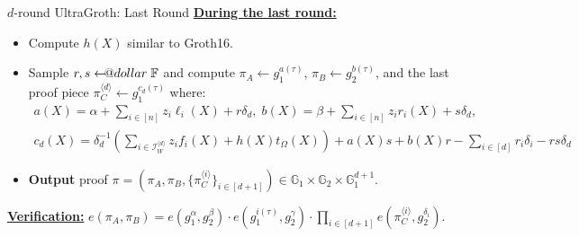 \documentclass{zkdl-presentation-template}
\makeatletter
\newcommand\leftarrowS{\leftarrow\joinrel\smalldollar}
\newcommand{\smalldollar}{\mathrel{\mathpalette\small@dollar\relax}}
\newcommand{\small@dollar}[2]{%
  \vcenter{\hbox{%
    $#1\textnormal{\fontsize{0.7\dimexpr\f@size pt}{0}\selectfont\$}$%
  }}%
}
\makeatother
\begin{document}
    \begin{frame}{$d$-round UltraGroth: Last Round}
        \underline{\textbf{During the last round:}}
        \begin{itemize}
            \item Compute $h(X)$ similar to Groth16.
            \item Sample $r,s \leftarrowS \mathbb{F}$ and compute $\pi_A \gets
            g_1^{a(\tau)}$, $\pi_B \gets g_2^{b(\tau)}$, and the last proof
            piece $\pi_C^{\langle d \rangle} \gets g_1^{c_d(\tau)}$ where:
            \begin{gather*}
                a(X) = \alpha + \sum_{i \in [n]} z_i\ell_i(X) + r\delta_d, \; b(X) = \beta + \sum_{i \in [n]}z_ir_i(X) + s\delta_d, \\
                c_d(X) = \delta_d^{-1}\left(\sum_{i \in \mathcal{I}_W^{\langle d \rangle}}z_if_i(X) + h(X)t_{\Omega}(X)\right) + a(X)s+b(X)r-\sum_{i \in [d]}r_i\delta_i - rs\delta_d
            \end{gather*}
            \item \textbf{Output} proof $\pi = (\pi_A,\pi_B,\{\pi_C^{\langle i
            \rangle}\}_{i \in [d+1]}) \in \mathbb{G}_1 \times \mathbb{G}_2
            \times \mathbb{G}_1^{d+1}$. 
        \end{itemize}

        \underline{\textbf{Verification:}} $e(\pi_A,\pi_B) = e(g_1^{\alpha},g_2^{\beta}) \cdot e(g_1^{i(\tau)},g_2^{\gamma}) \cdot \prod_{i \in [d+1]}e(\pi_C^{\langle i \rangle}, g_2^{\delta_i})$.
    \end{frame}
\end{document}
